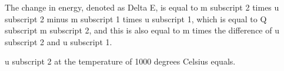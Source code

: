 The change in energy, denoted as Delta E, is equal to m subscript 2 times u subscript 2 minus m subscript 1 times u subscript 1, which is equal to Q subscript m subscript 2, and this is also equal to m times the difference of u subscript 2 and u subscript 1.

u subscript 2 at the temperature of 1000 degrees Celsius equals.